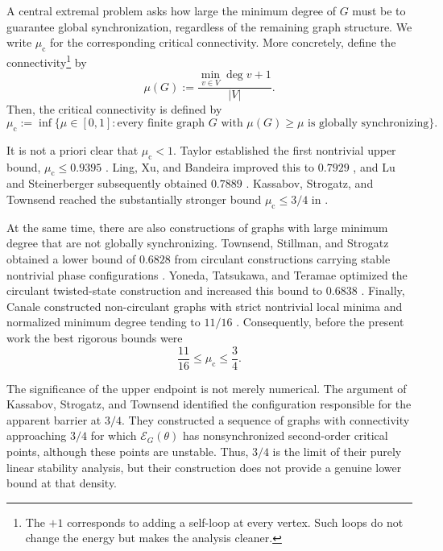 \documentclass[reqno,11pt]{amsart}
\theoremstyle{definition}
\begin{document}
A central extremal problem asks how large the minimum degree of \(G\) must be to guarantee global synchronization, regardless of the remaining graph structure. We write \(\mu_{\mathrm c}\) for the corresponding critical connectivity. More concretely, define the connectivity\footnote{The $+1$ corresponds to adding a self-loop at every vertex. Such loops do not change the energy but makes the analysis cleaner.} by
\begin{equation*}
    \mu(G) := \frac{\min_{v \in V} \deg v + 1}{|V|}.
\end{equation*}
Then, the critical connectivity is defined by
\begin{equation*}
    \mu_{\mathrm c}
    := \inf \bigl\{\mu\in[0,1] : \text{every finite graph }G
    \text{ with }\mu(G)\geq\mu\text{ is globally synchronizing}\bigr\}.
\end{equation*}

It is not a priori clear that $\mu_{\mathrm c}<1$. Taylor established the first nontrivial upper bound,
\(\mu_{\mathrm c}\leq 0.9395\) \cite{taylor-dense}. Ling, Xu, and Bandeira improved this to \(0.7929\) \cite{ling-xu-bandeira}, and Lu and Steinerberger subsequently obtained \(0.7889\) \cite{lu-steinerberger}. Kassabov, Strogatz, and Townsend reached the substantially stronger bound $ \mu_{\mathrm c}\le 3/4$ in \cite{kassabov-strogatz-townsend-dense}.

At the same time, there are also constructions of graphs with large minimum degree that are not globally synchronizing. Townsend, Stillman, and Strogatz obtained a lower bound of \(0.6828\) from circulant constructions carrying stable nontrivial phase configurations \cite{townsend-stillman-strogatz}. Yoneda, Tatsukawa, and Teramae optimized the circulant twisted-state construction and increased this bound to \(0.6838\) \cite{yoneda-tatsukawa-teramae}. Finally, Canale constructed non-circulant graphs with strict nontrivial local minima and normalized minimum degree tending to \(11/16\) \cite{canale-spinning}. Consequently, before the present work the best rigorous bounds were
\begin{equation*}
    \frac{11}{16}\le \mu_{\mathrm c}\le\frac34.
\end{equation*}

The significance of the upper endpoint is not merely numerical. The argument of Kassabov, Strogatz, and Townsend identified the configuration responsible for the apparent barrier at \(3/4\). They constructed a sequence of graphs with connectivity approaching $3/4$ for which $\mathcal E_G(\theta)$ has nonsynchronized second-order critical points, although these points are unstable. Thus, \(3/4\) is the limit of their purely linear stability analysis, but their construction does not provide a genuine lower bound at that density.
\end{document}
